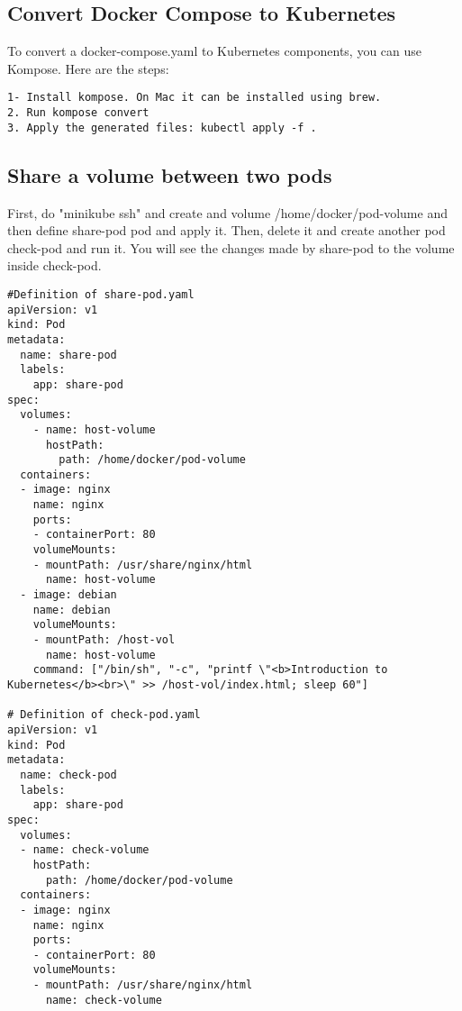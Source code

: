 \documentclass{article}
\begin{document}
\subsection{Convert Docker Compose to Kubernetes}
To convert a docker-compose.yaml to Kubernetes components, you can use Kompose. Here are the steps:

\begin{verbatim}
1- Install kompose. On Mac it can be installed using brew.
2. Run kompose convert
3. Apply the generated files: kubectl apply -f .
\end{verbatim}

\subsection{Share a volume between two pods}
First, do "minikube ssh" and create and volume /home/docker/pod-volume and then define share-pod pod and apply it. Then, delete it and create another pod check-pod and run it. 
You will see the changes made by share-pod to the volume inside check-pod. 

\begin{lstlisting}
#Definition of share-pod.yaml
apiVersion: v1
kind: Pod
metadata:
  name: share-pod
  labels:
    app: share-pod
spec:
  volumes:
    - name: host-volume
      hostPath:
        path: /home/docker/pod-volume
  containers:
  - image: nginx
    name: nginx
    ports:
    - containerPort: 80
    volumeMounts:
    - mountPath: /usr/share/nginx/html
      name: host-volume
  - image: debian
    name: debian
    volumeMounts:
    - mountPath: /host-vol
      name: host-volume
    command: ["/bin/sh", "-c", "printf \"<b>Introduction to Kubernetes</b><br>\" >> /host-vol/index.html; sleep 60"]

# Definition of check-pod.yaml
apiVersion: v1
kind: Pod
metadata:
  name: check-pod
  labels:
    app: share-pod
spec:
  volumes:
  - name: check-volume
    hostPath:
      path: /home/docker/pod-volume
  containers:
  - image: nginx
    name: nginx
    ports:
    - containerPort: 80
    volumeMounts:
    - mountPath: /usr/share/nginx/html
      name: check-volume

\end{lstlisting}
\end{document}
